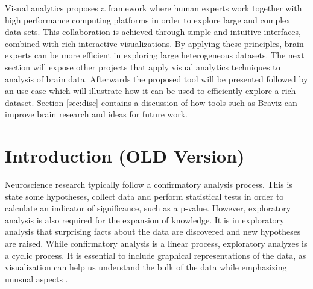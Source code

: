 \documentclass[utf8,paper]{frontiersSCNS} %
\begin{document}

Visual analytics \citep{cook_illuminating_2005} proposes a framework where human experts work together with high performance computing platforms in order to explore large and complex data sets. This collaboration is achieved through simple and intuitive interfaces, combined with rich interactive visualizations. By applying these principles, brain experts can be more efficient in exploring large heterogeneous datasets. The next section will expose other projects that apply visual analytics techniques to analysis of brain data. Afterwards the proposed tool will be presented followed by an use case which will illustrate how it can be used to efficiently explore a rich dataset. Section \ref{sec:disc} contains a discussion of how tools such as Braviz can improve brain research and ideas for future work.



\section{Introduction (OLD Version)}


Neuroscience research typically follow a confirmatory analysis process. This is state some hypotheses, collect data and perform statistical tests in order to calculate an indicator of significance, such as a p-value. However, exploratory analysis \citep{tukey_we_1980} is also required for the expansion of knowledge. It is in exploratory analysis that surprising facts about the data are discovered and new hypotheses are raised. While confirmatory analysis is a linear process, exploratory analyzes is a cyclic process. It is essential to include graphical representations of the data, as visualization can help us understand the bulk of the data while emphasizing unusual aspects \citep{wickham_practical_2008}.
\end{document}
